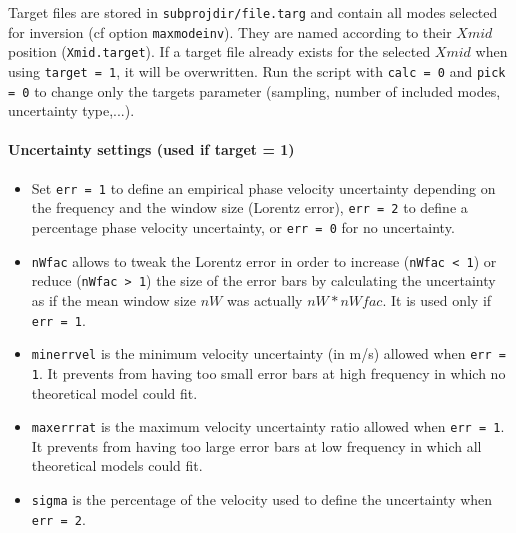 \documentclass[twoside,a4paper]{article}
\begin{document}
Target files are stored in \verb|subprojdir/file.targ| and contain all modes selected for inversion (cf option \verb|maxmodeinv|). They are named according to their $Xmid$ position (\verb|Xmid.target|). If a target file already exists for the selected $Xmid$ when using \verb|target = 1|, it will be overwritten. Run the script with \verb|calc = 0| and \verb|pick = 0| to change only the targets parameter (sampling, number of included modes, uncertainty type,...).

\paragraph{Uncertainty settings (used if target = 1)}
\begin{itemize}[leftmargin=*]
\setlength\itemsep{2ex}
\item Set \verb|err = 1| to define an empirical phase velocity uncertainty depending on the frequency and the window size (Lorentz error), \verb|err = 2| to define a percentage phase velocity uncertainty, or \verb|err = 0| for no uncertainty.

\item \verb|nWfac| allows to tweak the Lorentz error in order to increase (\verb|nWfac < 1|) or reduce (\verb|nWfac > 1|) the size of the error bars by calculating the uncertainty as if the mean window size $nW$ was actually $nW*nWfac$. It is used only if \verb|err = 1|.

\item \verb|minerrvel| is the minimum velocity uncertainty (in m/s) allowed when \verb|err = 1|. It prevents from having too small error bars at high frequency in which no theoretical model could fit.

\item \verb|maxerrrat| is the maximum velocity uncertainty ratio allowed when \verb|err = 1|. It prevents from having too large error bars at low frequency in which all theoretical models could fit.

\item \verb|sigma| is the percentage of the velocity used to define the uncertainty when \verb|err = 2|.
\end{itemize}
\end{document}
